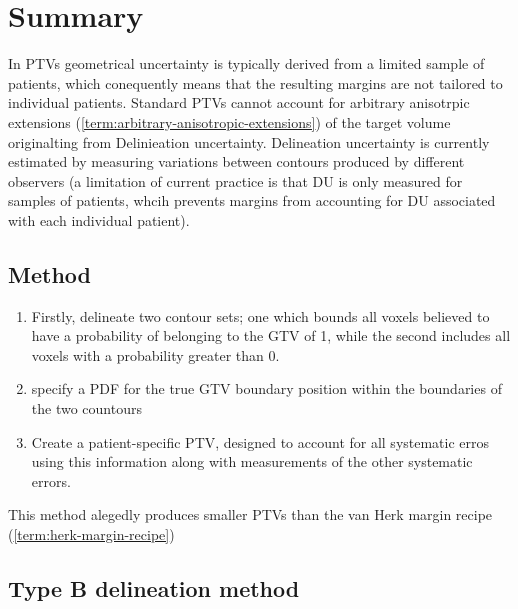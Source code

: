 \documentclass[11pt]{article}
\begin{document}


\tableofcontents

\clearpage

\section{Summary}

In PTVs geometrical uncertainty is typically derived from a limited sample of patients, which conequently means that the resulting margins are not tailored to individual patients. Standard PTVs cannot account for arbitrary anisotrpic extensions (\ref{term:arbitrary-anisotropic-extensions}) of the target volume originalting from Delinieation uncertainty. Delineation uncertainty is currently estimated by measuring variations between contours produced by different observers (a limitation of current practice is that DU is only measured for samples of patients, whcih prevents margins from accounting for DU associated with each individual patient).

\subsection{Method}

\begin{enumerate}
    \item Firstly, delineate two contour sets; one which bounds all voxels believed to have a probability of belonging to the GTV of 1, while the second includes all voxels with a probability greater than 0.
    \item specify a PDF for the true GTV boundary position within the boundaries of the two countours
    \item Create a patient-specific PTV, designed to account for all systematic erros using this information along with measurements of the other systematic errors.
\end{enumerate}

This method alegedly produces smaller PTVs than the van Herk margin recipe (\ref{term:herk-margin-recipe})

\subsection{Type B delineation method}
\end{document}

